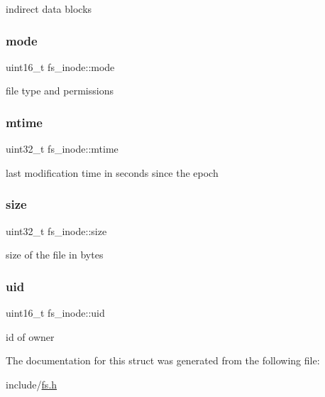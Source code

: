 indirect data blocks \mbox{\label{structfs__inode_a04b2f2016a6abba84872c15d6554c6b1}} 
\subsubsection{\texorpdfstring{mode}{mode}}
{\footnotesize\ttfamily uint16\+\_\+t fs\+\_\+inode\+::mode}

file type and permissions \mbox{\label{structfs__inode_ab11566bfc13bcd9f7cf24121447b0cfd}} 
\subsubsection{\texorpdfstring{mtime}{mtime}}
{\footnotesize\ttfamily uint32\+\_\+t fs\+\_\+inode\+::mtime}

last modification time in seconds since the epoch \mbox{\label{structfs__inode_ac10de2ad4b7c87da65fc17b5674b5759}} 
\subsubsection{\texorpdfstring{size}{size}}
{\footnotesize\ttfamily uint32\+\_\+t fs\+\_\+inode\+::size}

size of the file in bytes \mbox{\label{structfs__inode_ada0d9d68adb122d7e83558a1b8f683ec}} 
\subsubsection{\texorpdfstring{uid}{uid}}
{\footnotesize\ttfamily uint16\+\_\+t fs\+\_\+inode\+::uid}

id of owner 

The documentation for this struct was generated from the following file\+:\begin{DoxyCompactItemize}
\item 
include/\mbox{\hyperlink{fs_8h}{fs.\+h}}\end{DoxyCompactItemize}
